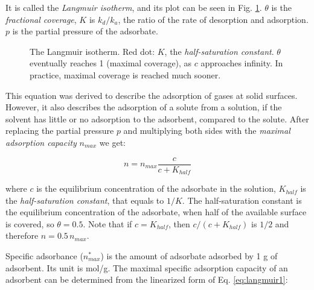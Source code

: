 It is called the \emph{Langmuir isotherm}, and its plot can be seen in Fig. \ref{fig:langmuir}. $\theta$ is the \emph{fractional coverage}, $K$ is $k_d/k_a$, the ratio of the rate of desorption and adsorption. $p$ is the partial pressure of the adsorbate.

\begin{figure}
\centering
{}
\caption{The Langmuir isotherm. Red dot: $K$, the \emph{half-saturation constant}. $\theta$ eventually reaches 1 (maximal coverage), as $c$ approaches infinity. In practice, maximal coverage is reached much sooner.}
\label{fig:langmuir}
\end{figure}

This equation was derived to describe the adsorption of gases at solid surfaces. However, it also describes the adsorption of a solute from a solution, if the solvent has little or no adsorption to the adsorbent, compared to the solute. After replacing the partial pressure $p$ and multiplying both sides with the \emph{maximal adsorption capacity} $n_{max}$ we get:

\begin{equation}
\label{eq:langmuir2}
        n
        =
        n_{max}
	\frac
                {c}
                {c + K_{half}} 
\end{equation}

where $c$ is the equilibrium concentration of the adsorbate in the solution, $K_{half}$ is the \emph{half-saturation constant}, that equals to $1/K$. The half-saturation constant is the equilibrium concentration of the adsorbate, when half of the available surface is covered, so $\theta = 0.5$. Note that if $c = K_{half}$, then $c/(c + K_{half})$ is $1/2$ and therefore $n = 0.5\, n_{max}$. 

Specific adsorbance ($n^*_{max}$) is the amount of adsorbate adsorbed by 1 g of adsorbent. Its unit is mol/g. The maximal specific adsorption capacity of an adsorbent can be determined from the linearized form of Eq. \ref{eq:langmuir1}:

